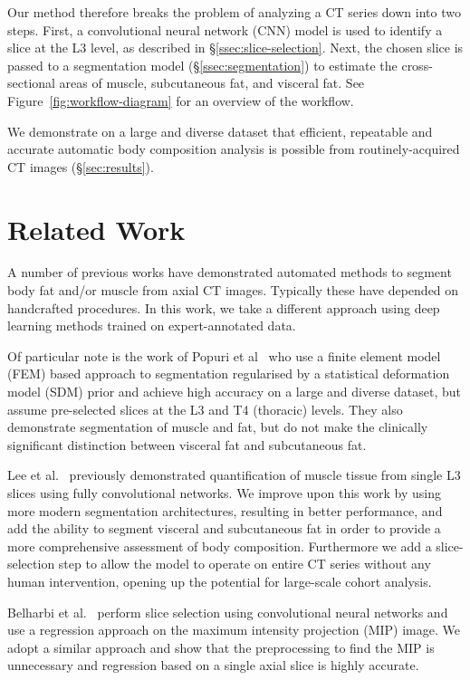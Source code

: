\documentclass{llncs}
\begin{document}
Our method therefore breaks the problem of analyzing a CT series down into two steps.
First, a convolutional neural network (CNN) model is used to identify a slice at the L3 level, as described in \S\ref{ssec:slice-selection}.
Next, the chosen slice is passed to a segmentation model (\S\ref{ssec:segmentation}) to estimate the cross-sectional areas of muscle, subcutaneous fat, and visceral fat.
See Figure~\ref{fig:workflow-diagram} for an overview of the workflow.

We demonstrate on a large and diverse dataset that efficient, repeatable and accurate automatic body composition analysis is possible from routinely-acquired CT images (\S\ref{sec:results}).

\section{Related Work}

A number of previous works \cite{Kim2016,Kullberg2017,Lee2017,Parikh2017,Popuri2016} have demonstrated automated methods to segment body fat and/or muscle from axial CT images.
Typically these have depended on handcrafted procedures. In this work, we take a different approach using deep learning methods trained on expert-annotated data.

Of particular note is the work of Popuri et al~\cite{Popuri2016} who use a finite element model (FEM) based approach to segmentation regularised by a statistical deformation model (SDM) prior and achieve high accuracy on a large and diverse dataset, but assume pre-selected slices at the L3 and T4 (thoracic) levels.
They also demonstrate segmentation of muscle and fat, but do not make the clinically significant distinction between visceral fat and subcutaneous fat.

Lee et al.~\cite{Lee2017} previously demonstrated quantification of muscle tissue from single L3 slices using fully convolutional networks.
We improve upon this work by using more modern segmentation architectures, resulting in better performance, and add the ability to segment visceral and subcutaneous fat in order to provide a more comprehensive assessment of body composition.
Furthermore we add a slice-selection step to allow the model to operate on entire CT series without any human intervention, opening up the potential for large-scale cohort analysis.

Belharbi et al.~\cite{Belharbi2017} perform slice selection using convolutional neural networks and use a regression approach on the maximum intensity projection (MIP) image.
We adopt a similar approach and show that the preprocessing to find the MIP is unnecessary and regression based on a single axial slice is highly accurate.
\end{document}
